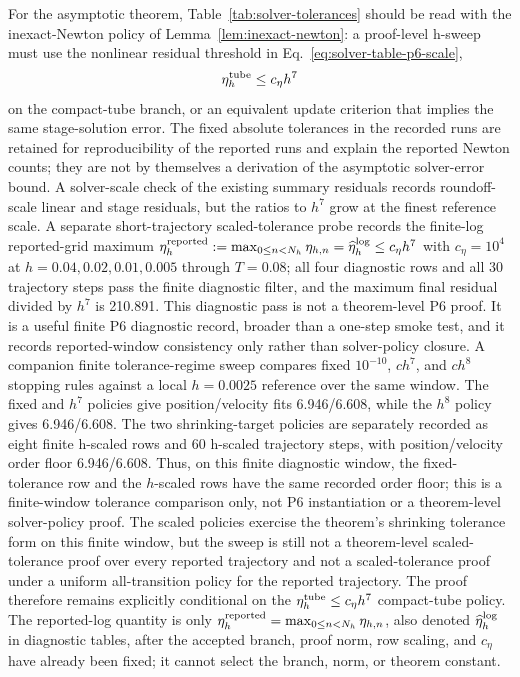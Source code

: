 \documentclass[preprint,12pt]{elsarticle}
\begin{document}
For the asymptotic theorem, Table~\ref{tab:solver-tolerances} should be read
with the inexact-Newton policy of Lemma~\ref{lem:inexact-newton}: a proof-level
h-sweep must use the nonlinear residual threshold in
Eq.~\eqref{eq:solver-table-p6-scale},
\begin{equation}
\label{eq:solver-table-p6-scale}
  \eta_h^{\rm tube} \le c_\eta h^7
\end{equation}
on the compact-tube branch, or an equivalent update criterion that implies
the same stage-solution error. The fixed absolute tolerances in the recorded
runs are retained for reproducibility of the reported runs and explain the
reported Newton counts; they are not by themselves a derivation of the
asymptotic solver-error bound. A solver-scale check of the existing summary
residuals records roundoff-scale linear and stage residuals, but the ratios to
$h^7$ grow at the finest reference scale. A separate short-trajectory
scaled-tolerance probe records the finite-log reported-grid maximum
\(\eta_h^{\rm reported}:=\max_{0\le n<N_h}\eta_{h,n}
=\widehat\eta_h^{\rm log}\le c_\eta h^7\)
with \(c_\eta=10^4\) at
$h=0.04,0.02,0.01,0.005$ through $T=0.08$; all four diagnostic rows and all
30 trajectory steps pass the finite diagnostic filter, and the maximum final
residual divided by $h^7$ is 210.891. This diagnostic pass is not a
theorem-level P6 proof. It is a useful finite P6 diagnostic record, broader
than a one-step smoke test, and it records reported-window consistency only
rather than solver-policy closure. A companion finite tolerance-regime sweep compares fixed
$10^{-10}$, $c h^7$, and $c h^8$ stopping rules against a local
$h=0.0025$ reference over the same window. The fixed and $h^7$ policies give
position/velocity fits 6.946/6.608, while the $h^8$ policy gives
6.946/6.608. The two shrinking-target policies are separately recorded as
eight finite h-scaled rows and 60 h-scaled trajectory steps, with
position/velocity order floor 6.946/6.608. Thus, on this finite diagnostic
window, the fixed-tolerance row and the \(h\)-scaled rows have the same
recorded order floor; this is a finite-window tolerance comparison only, not
P6 instantiation or a theorem-level solver-policy proof. The scaled policies
exercise the theorem's shrinking tolerance form on this finite window, but the
sweep is still not a theorem-level scaled-tolerance proof over every reported
trajectory and not a scaled-tolerance proof under a uniform all-transition
policy for the reported trajectory.
The proof therefore remains explicitly conditional on the
\(\eta_h^{\rm tube}\le c_\eta h^7\) compact-tube policy.  The reported-log
quantity is only
\(\eta_h^{\rm reported}=\max_{0\le n<N_h}\eta_{h,n}\), also denoted
\(\widehat\eta_h^{\rm log}\) in diagnostic tables, after the accepted branch,
proof norm, row scaling, and \(c_\eta\) have already been fixed; it cannot
select the branch, norm, or theorem constant.
\end{document}
